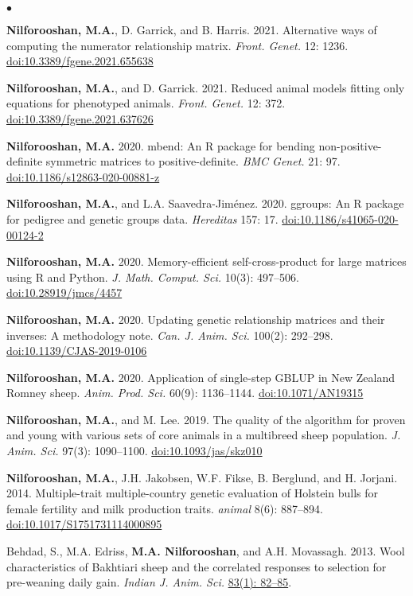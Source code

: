 \documentclass[margin,line]{res}
\newenvironment{list2}{
  \begin{list}{$\bullet$}{%
      \setlength{\itemsep}{0in}
      \setlength{\parsep}{0in} \setlength{\parskip}{0in}
      \setlength{\topsep}{0in} \setlength{\partopsep}{0in}
      \setlength{\leftmargin}{0.2in}}}{\end{list}}
\begin{document}
\begin{resume}
\begin{list2}
\item {\bf Nilforooshan, M.A.}, D. Garrick, and B. Harris. 2021. Alternative ways of computing the numerator relationship matrix. {\em Front. Genet.} 12: 1236. \href{https://doi.org/10.3389/fgene.2021.655638}{doi:10.3389/fgene.2021.655638}
\item {\bf Nilforooshan, M.A.}, and D. Garrick. 2021. Reduced animal models fitting only equations for phenotyped animals. {\em Front. Genet.} 12: 372. \href{https://doi.org/10.3389/fgene.2021.637626}{doi:10.3389/fgene.2021.637626}
\item {\bf Nilforooshan, M.A.} 2020. mbend: An R package for bending non-positive-deﬁnite symmetric matrices to positive-deﬁnite. {\em BMC Genet.} 21: 97. \href{https://doi.org/10.1186/s12863-020-00881-z}{doi:10.1186/s12863-020-00881-z}
\item {\bf Nilforooshan, M.A.}, and L.A. Saavedra-Jim\'{e}nez. 2020. ggroups: An R package for pedigree and genetic groups data. {\em Hereditas} 157: 17. \href{https://doi.org/10.1186/s41065-020-00124-2}{doi:10.1186/s41065-020-00124-2}
\item {\bf Nilforooshan, M.A.} 2020. Memory-efficient self-cross-product for large matrices using R and Python. {\em J. Math. Comput. Sci.} 10(3): 497--506. \href{https://doi.org/10.28919/jmcs/4457}{doi:10.28919/jmcs/4457}
\item {\bf Nilforooshan, M.A.} 2020. Updating genetic relationship matrices and their inverses: A methodology note. {\em Can. J. Anim. Sci.} 100(2): 292--298. \href{https://doi.org/10.1139/CJAS-2019-0106}{doi:10.1139/CJAS-2019-0106}
\item {\bf Nilforooshan, M.A.} 2020. Application of single-step GBLUP in New Zealand Romney sheep. {\em Anim. Prod. Sci.} 60(9): 1136--1144. \href{https://doi.org/10.1071/AN19315}{doi:10.1071/AN19315}
\item {\bf Nilforooshan, M.A.}, and M. Lee. 2019. The quality of the algorithm for proven and young with various sets of core animals in a multibreed sheep population. {\em J. Anim. Sci.} 97(3): 1090--1100. \href{https://doi.org/10.1093/jas/skz010}{doi:10.1093/jas/skz010}
\item {\bf Nilforooshan, M.A.}, J.H. Jakobsen, W.F. Fikse, B. Berglund, and H. Jorjani. 2014. Multiple-trait multiple-country genetic evaluation of Holstein bulls for female fertility and milk production traits. {\em animal} 8(6): 887--894. \href{https://doi.org/10.1017/S1751731114000895}{doi:10.1017/S1751731114000895}
\item Behdad, S., M.A. Edriss, {\bf M.A. Nilforooshan}, and A.H. Movassagh. 2013. Wool characteristics of Bakhtiari sheep and the correlated responses to selection for pre-weaning daily gain. {\em Indian J. Anim. Sci.} \href{http://epubs.icar.org.in/ejournal/index.php/IJAnS/article/view/26453}{83(1): 82--85}.

\end{list2}
\end{resume}
\end{document}
